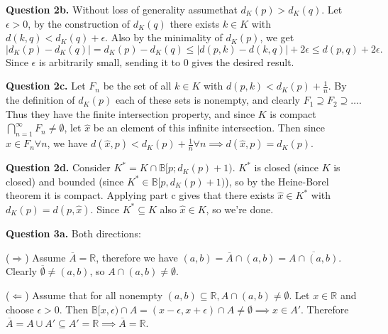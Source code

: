 \documentclass[letterpaper, reqno,11pt]{article}
\begin{document}

{\medskip\noindent\bf Question 2b.} Without loss of generality assumethat $d_{K}(p)>d_{K}(q)$. Let $\epsilon>0$, by the construction of $d_K(q)$ there exists $k\in K$ with $d(k,q)<d_K(q)+\epsilon$. Also by the minimality of $d_{K}(p)$, we get
\[
\left| d_K(p)-d_K(q) \right| =d_K(p)-d_K(q)\leq \left| d(p,k)-d(k,q) \right| +2\epsilon\leq d(p,q)+2\epsilon
.\]
Since $\epsilon$ is arbitrarily small, sending it to 0 gives the desired result.

{\medskip\noindent\bf Question 2c.} Let $F_n$ be the set of all $k\in K$ with $d(p,k)<d_K(p)+\frac{1}{n}$. By the definition of $d_K(p)$ each of these sets is nonempty, and clearly $F_1\supseteq F_2\supseteq\ldots$. Thus they have the finite intersection property, and since $K$ is compact $\bigcap_{n=1}^{\infty}F_n\neq \emptyset$, let $\hat x$ be an element of this infinite intersection. Then since $\hat x\in F_n\forall n$, we have $d(\hat x,p)<d_K(p)+\frac{1}{n}\forall n\implies d(\hat x,p)=d_K(p)$.


{\medskip\noindent\bf Question 2d.} Consider $K^{*}=K\cap \mathbb B[p;d_K(p)+1)$. $K^{*}$ is closed (since $K$ is closed) and bounded (since $K^{*}\in \mathbb B[p,d_K(p)+1)$), so by the Heine-Borel theorem it is compact. Applying part c gives that there exists $\hat x\in K^{*}$ with $d_K(p)=d(p,\hat x)$. Since $K^{*}\subseteq K$ also $\hat x\in K$, so we're done.

\newpage\phantom{blabla}
\newpage

{\medskip\noindent\bf Question 3a.} Both directions:

($\Longrightarrow$) Assume $\overline{A}=\mathbb{R}$, therefore we have $(a,b)=\overline{A}\cap (a,b)=\overline{A\cap (a,b)}$. Clearly $\overline{\emptyset}\neq (a,b)$, so $A\cap (a,b)\neq\emptyset$.

($\Longleftarrow$) Assume that for all nonempty $(a,b)\subseteq \mathbb{R},A\cap (a,b)\neq\emptyset$. Let $x\in \mathbb{R}$ and choose $\epsilon>0$. Then $\mathbb B[x,\epsilon)\cap A=(x-\epsilon,x+\epsilon)\cap A\neq \emptyset\implies x\in A'$. Therefore $\overline{A}=A\cup A'\subseteq A'=\mathbb{R}\implies \overline{A}=\mathbb{R}$.
\end{document}
